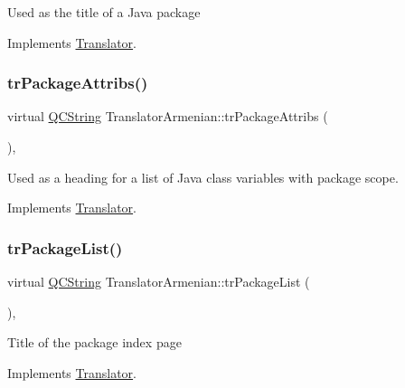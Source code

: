 Used as the title of a Java package 

Implements \mbox{\hyperlink{class_translator}{Translator}}.

\mbox{\label{class_translator_armenian_a404c6e4bc112374844b6a4534f65c9f6}} 
\subsubsection{\texorpdfstring{trPackageAttribs()}{trPackageAttribs()}}
{\footnotesize\ttfamily virtual \mbox{\hyperlink{class_q_c_string}{Q\+C\+String}} Translator\+Armenian\+::tr\+Package\+Attribs (\begin{DoxyParamCaption}{ }\end{DoxyParamCaption})\hspace{0.3cm}{\ttfamily [inline]}, {\ttfamily [virtual]}}

Used as a heading for a list of Java class variables with package scope. 

Implements \mbox{\hyperlink{class_translator}{Translator}}.

\mbox{\label{class_translator_armenian_a4cf6ac201618bd56fbf08e9dd973159c}} 
\subsubsection{\texorpdfstring{trPackageList()}{trPackageList()}}
{\footnotesize\ttfamily virtual \mbox{\hyperlink{class_q_c_string}{Q\+C\+String}} Translator\+Armenian\+::tr\+Package\+List (\begin{DoxyParamCaption}{ }\end{DoxyParamCaption})\hspace{0.3cm}{\ttfamily [inline]}, {\ttfamily [virtual]}}

Title of the package index page 

Implements \mbox{\hyperlink{class_translator}{Translator}}.

\mbox{\label{class_translator_armenian_a157eb7a3308f26a201f94164e993d219}} 
